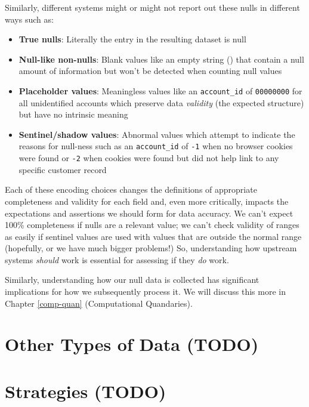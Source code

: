 \documentclass[
]{krantz}
\providecommand{\tightlist}{%
  \setlength{\itemsep}{0pt}\setlength{\parskip}{0pt}}
\begin{document}
Similarly, different systems might or might not report out these nulls in different ways such as:

\begin{itemize}
\tightlist
\item
  \textbf{True nulls}: Literally the entry in the resulting dataset is null
\item
  \textbf{Null-like non-nulls}: Blank values like an empty string (\texttt{\textquotesingle{}\textquotesingle{}}) that contain a null amount of information but won't be detected when counting null values
\item
  \textbf{Placeholder values}: Meaningless values like an \texttt{account\_id} of \texttt{00000000} for all unidentified accounts which preserve data \emph{validity} (the expected structure) but have no intrinsic meaning
\item
  \textbf{Sentinel/shadow values}: Abnormal values which attempt to indicate the reasons for null-ness such as an \texttt{account\_id} of \texttt{-1} when no browser cookies were found or \texttt{-2} when cookies were found but did not help link to any specific customer record
\end{itemize}

Each of these encoding choices changes the definitions of appropriate completeness and validity for each field and, even more critically, impacts the expectations and assertions we should form for data accuracy.
We can't expect 100\% completeness if nulls are a relevant value; we can't check validity of ranges as easily if sentinel values are used with values that are outside the normal range (hopefully, or we have much bigger problems!)
So, understanding how upstream systems \emph{should} work is essential for assessing if they \emph{do} work.

Similarly, understanding how our null data is collected has significant implications for how we subsequently process it. We will discuss this more in Chapter \ref{comp-quan} (Computational Quandaries).

\hypertarget{other-types-of-data-todo}{%
\section{Other Types of Data (TODO)}\label{other-types-of-data-todo}}

\hypertarget{strategies-todo}{%
\section{Strategies (TODO)}\label{strategies-todo}}
\end{document}
